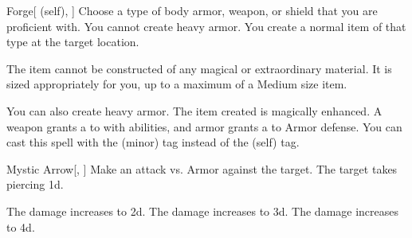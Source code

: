 \lowercase{\hypertarget{spell:Forge}{}}\label{spell:Forge}
\begin{attuneability}[Rank 1]{\hypertarget{spell:Forge}{Forge}}[ (self), ]
Choose a type of body armor, weapon, or shield that you are proficient with.
You cannot create heavy armor.
You create a normal item of that type at the target location.

The item cannot be constructed of any magical or extraordinary material.
It is sized appropriately for you, up to a maximum of a Medium size item.

\rankline
{} You can also create heavy armor.
 The item created is magically enhanced.
A weapon grants a   to  with  abilities,
and armor grants a   to Armor defense.
 You can cast this spell with the  (minor) tag instead of the  (self) tag.
\end{attuneability}
\vspace{0.25em}



\lowercase{\hypertarget{spell:Mystic Arrow}{}}\label{spell:Mystic Arrow}
\begin{freeability}[Rank 1]{\hypertarget{spell:Mystic Arrow}{Mystic Arrow}}[, ]
Make an attack vs. Armor against the target.
\hit The target takes piercing  \plus1d.

\rankline
{} The damage increases to  \plus2d.
 The damage increases to  \plus3d.
 The damage increases to  \plus4d.
\end{freeability}
\vspace{0.25em}



